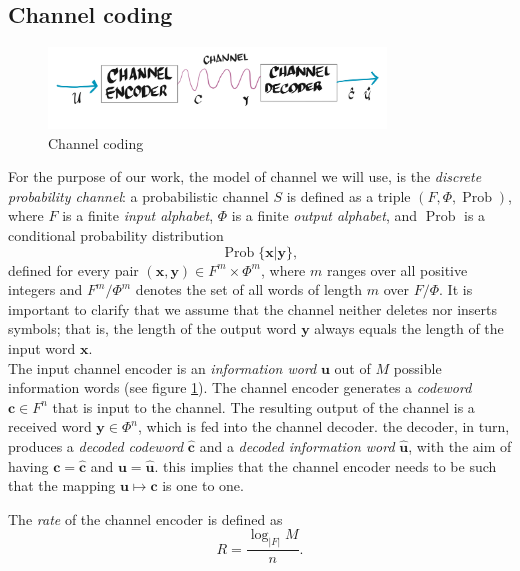 \subsection{Channel coding}
\begin{figure}[H]
\centering
\includegraphics[width=0.8\textwidth]{Figures/Channel_decoder.png}
\caption{Channel coding}
\label{CH2:Channel_communication_2}
\end{figure}
For the purpose of our work, the model of channel we will use, is the \textit{discrete probability channel}: a probabilistic channel $S$ is defined as a triple $(F,\Phi,\operatorname{Prob})$, where $F$ is a finite \textit{input alphabet}, $\Phi$ is a finite \textit{output alphabet}, and $\operatorname{Prob}$ is a conditional probability distribution
\begin{equation}
\operatorname{Prob}\{\mathbf{x}|\mathbf{y}\},
\end{equation}
defined for every pair $(\mathbf{x},\mathbf{y})\in F^{m}\times\Phi^m$, where $m$ ranges over all positive integers and $F^m/\Phi^m$ denotes the set of all words of length $m$ over $F/\Phi$. It is important to clarify that we assume that the channel neither deletes nor inserts symbols; that is, the length of the output word $\mathbf{y}$ always equals the length of the input word $\mathbf{x}$.\\
\indent The input channel encoder is an \textit{information word} $\mathbf{u}$ out of $M$ possible information words (see figure \ref{CH2:Channel_communication_2}). The channel encoder generates a \textit{codeword} $\mathbf{c}\in F^n$ that is input to the channel. The resulting output of the channel is a received word $\mathbf{y}\in\Phi^n$, which is fed into the channel decoder. the decoder, in turn, produces a \textit{decoded codeword} $\hat{\mathbf{c}}$ and a \textit{decoded information word} $\hat{\mathbf{u}}$, with the aim of having $\mathbf{c}=\hat{\mathbf{c}}$ and $\mathbf{u}=\hat{\mathbf{u}}$. this implies that the channel encoder needs to be such that the mapping $\mathbf{u}\mapsto \mathbf{c}$ is one to one.
\begin{definition}[Rate]
The \textit{rate} of the channel encoder is defined as 
\begin{equation}
R = \frac{\log_{|F|}M}{n}.
\end{equation}
\end{definition}
